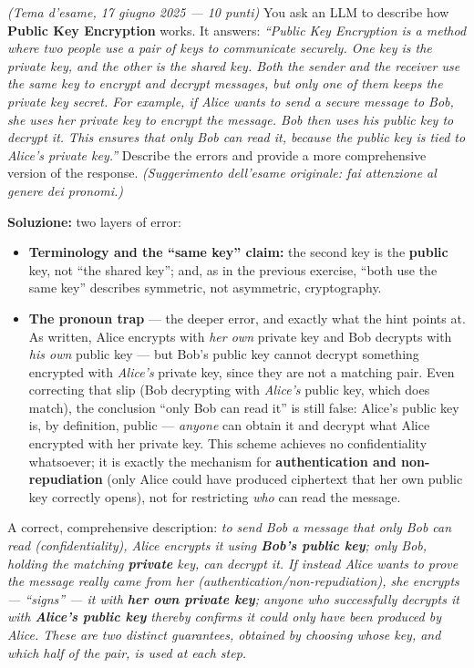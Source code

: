 \documentclass[12pt, a4paper]{article}
\newcounter{esercizio}[section]
\begin{document}
\begin{tcolorbox}[colback=lightergray!10, colframe=tocsec, title=\textbf{Esercizio \theesercizio}]
\textit{(Tema d'esame, 17 giugno 2025 --- 10 punti)} You ask an LLM to describe how \textbf{Public Key Encryption} works. It answers: \textit{``Public Key Encryption is a method where two people use a pair of keys to communicate securely. One key is the private key, and the other is the shared key. Both the sender and the receiver use the same key to encrypt and decrypt messages, but only one of them keeps the private key secret. For example, if Alice wants to send a secure message to Bob, she uses her private key to encrypt the message. Bob then uses his public key to decrypt it. This ensures that only Bob can read it, because the public key is tied to Alice's private key.''} Describe the errors and provide a more comprehensive version of the response. \textit{(Suggerimento dell'esame originale: fai attenzione al genere dei pronomi.)}
\end{tcolorbox}

\textbf{Soluzione:} two layers of error:
\begin{itemize}
    \item \textbf{Terminology and the ``same key'' claim:} the second key is the \textbf{public} key, not ``the shared key''; and, as in the previous exercise, ``both use the same key'' describes symmetric, not asymmetric, cryptography.
    \item \textbf{The pronoun trap} --- the deeper error, and exactly what the hint points at. As written, Alice encrypts with \emph{her own} private key and Bob decrypts with \emph{his own} public key --- but Bob's public key cannot decrypt something encrypted with \emph{Alice's} private key, since they are not a matching pair. Even correcting that slip (Bob decrypting with \emph{Alice's} public key, which does match), the conclusion ``only Bob can read it'' is still false: Alice's public key is, by definition, public --- \emph{anyone} can obtain it and decrypt what Alice encrypted with her private key. This scheme achieves no confidentiality whatsoever; it is exactly the mechanism for \textbf{authentication and non-repudiation} (only Alice could have produced ciphertext that her own public key correctly opens), not for restricting \emph{who} can read the message.
\end{itemize}
A correct, comprehensive description: \textit{to send Bob a message that only Bob can read (confidentiality), Alice encrypts it using \textbf{Bob's public key}; only Bob, holding the matching \textbf{private} key, can decrypt it. If instead Alice wants to prove the message really came from her (authentication/non-repudiation), she encrypts --- ``signs'' --- it with \textbf{her own private key}; anyone who successfully decrypts it with \textbf{Alice's public key} thereby confirms it could only have been produced by Alice. These are two distinct guarantees, obtained by choosing whose key, and which half of the pair, is used at each step.}
\end{document}
